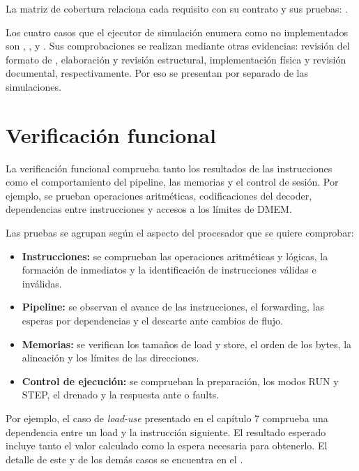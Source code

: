 La matriz de cobertura relaciona cada requisito con su contrato y sus pruebas:
.

Los cuatro casos que el ejecutor de simulación enumera como no implementados son
, ,
 y . Sus comprobaciones se
realizan mediante otras evidencias: revisión del formato de ,
elaboración y revisión estructural, implementación física y revisión documental,
respectivamente. Por eso se presentan por separado de las simulaciones.

\section{Verificación funcional}

La verificación funcional comprueba tanto los resultados de las instrucciones
como el comportamiento del pipeline, las memorias y el control de sesión. Por
ejemplo, se prueban operaciones aritméticas, codificaciones del decoder,
dependencias entre instrucciones y accesos a los límites de DMEM.

Las pruebas se agrupan según el aspecto del procesador que se quiere comprobar:

\begin{itemize}
  \item \textbf{Instrucciones:} se comprueban las operaciones aritméticas y
    lógicas, la formación de inmediatos y la identificación de instrucciones
    válidas e inválidas.
  \item \textbf{Pipeline:} se observan el avance de las instrucciones, el
    forwarding, las esperas por dependencias y el descarte ante cambios de flujo.
  \item \textbf{Memorias:} se verifican los tamaños de load y store, el orden
    de los bytes, la alineación y los límites de las direcciones.
  \item \textbf{Control de ejecución:} se comprueban la preparación, los
    modos RUN y STEP, el drenado y la respuesta ante  o faults.
\end{itemize}

Por ejemplo, el caso de \emph{load-use} presentado en el capítulo 7 comprueba
una dependencia entre un load y la instrucción siguiente. El resultado esperado
incluye tanto el valor calculado como la espera necesaria para obtenerlo. El
detalle de este y de los demás casos se encuentra en el
.

